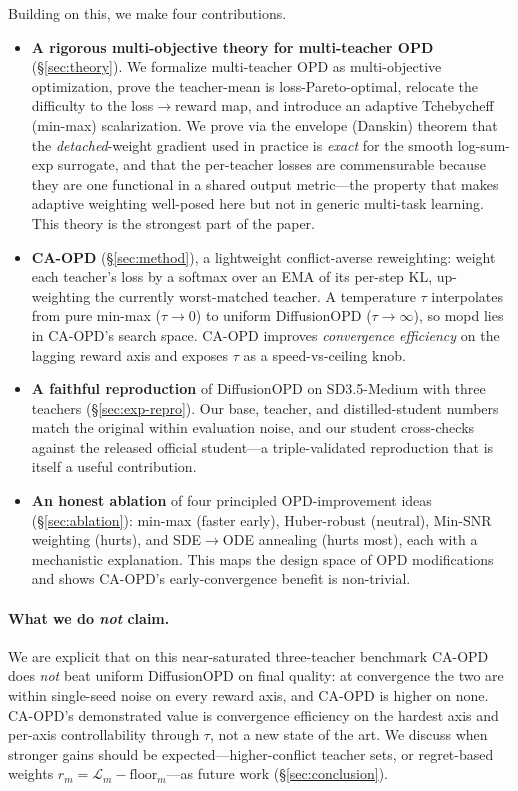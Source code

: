 Building on this, we make four contributions.

\begin{itemize}
  \item \textbf{A rigorous multi-objective theory for multi-teacher OPD}
  (\S\ref{sec:theory}). We formalize multi-teacher OPD as multi-objective
  optimization, prove the teacher-mean is loss-Pareto-optimal, relocate the
  difficulty to the loss$\to$reward map, and introduce an adaptive Tchebycheff
  (min-max) scalarization. We prove via the envelope (Danskin) theorem that the
  \emph{detached}-weight gradient used in practice is \emph{exact} for the smooth
  log-sum-exp surrogate, and that the per-teacher losses are commensurable
  because they are one functional in a shared output metric---the property that
  makes adaptive weighting well-posed here but not in generic multi-task
  learning. This theory is the strongest part of the paper.

  \item \textbf{CA-OPD} (\S\ref{sec:method}), a lightweight conflict-averse
  reweighting: weight each teacher's loss by a softmax over an EMA of its
  per-step KL, up-weighting the currently worst-matched teacher. A temperature
  $\tau$ interpolates from pure min-max ($\tau\to0$) to uniform DiffusionOPD
  ($\tau\to\infty$), so mopd lies in CA-OPD's search space. CA-OPD improves
  \emph{convergence efficiency} on the lagging reward axis and exposes $\tau$ as
  a speed-vs-ceiling knob.

  \item \textbf{A faithful reproduction} of DiffusionOPD on SD3.5-Medium with
  three teachers (\S\ref{sec:exp-repro}). Our base, teacher, and distilled-student
  numbers match the original within evaluation noise, and our student
  cross-checks against the released official student---a triple-validated
  reproduction that is itself a useful contribution.

  \item \textbf{An honest ablation} of four principled OPD-improvement ideas
  (\S\ref{sec:ablation}): min-max (faster early), Huber-robust (neutral), Min-SNR
  weighting (hurts), and SDE$\to$ODE annealing (hurts most), each with a
  mechanistic explanation. This maps the design space of OPD modifications and
  shows CA-OPD's early-convergence benefit is non-trivial.
\end{itemize}

\paragraph{What we do \emph{not} claim.}
We are explicit that on this near-saturated three-teacher benchmark CA-OPD does
\emph{not} beat uniform DiffusionOPD on final quality: at convergence the two are
within single-seed noise on every reward axis, and CA-OPD is higher on none. CA-OPD's
demonstrated value is convergence efficiency on the hardest axis and per-axis
controllability through $\tau$, not a new state of the art. We discuss when
stronger gains should be expected---higher-conflict teacher sets, or
regret-based weights $r_m=\mathcal L_m-\mathrm{floor}_m$---as future work
(\S\ref{sec:conclusion}).
